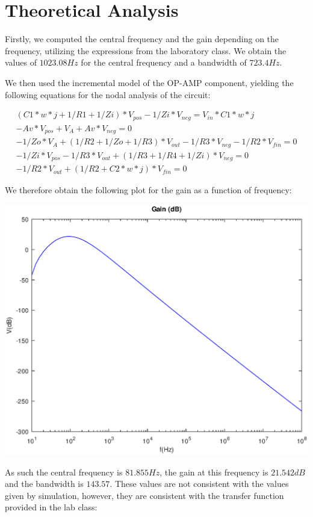 \section{Theoretical Analysis}
\label{sec:analysis}

Firstly, we computed the central frequency and the gain depending on the frequency, utilizing the expressions from  the laboratory class.
We obtain the values of $1023.08 Hz$ for the central frequency and a bandwidth of $723.4 Hz$.

We then used the incremental model of the OP-AMP component, yielding the following equations for the nodal analysis of the circuit:

\begin{equation}
    \begin{split}
        (C1*w*j+1/R1+1/Zi)*V_{pos}-1/Zi*V_{neg}=V_{in}*C1*w*j\\
        -Av*V_{pos}+V_{A}+Av*V_{neg}=0\\
        -1/Zo*V_{A}+(1/R2+1/Zo+1/R3)*V_{out}-1/R3*V_{neg}-1/R2*V_{fin}=0\\
        -1/Zi*V_{pos}-1/R3*V_{out}+(1/R3+1/R4+1/Zi)*V_{neg}=0\\
        -1/R2*V_{out}+(1/R2+C2*w*j)*V_{fin}=0
    \end{split}
\end{equation}

We therefore obtain the following plot for the gain as a function of frequency:

\includegraphics[width=0.8\linewidth]{t5dB.eps}

As such the central frequency is $81.855 Hz$, the gain at this frequency is $21.542 dB$ and the bandwidth is $143.57$.
These values are not consistent with the values given by simulation, however, they are consistent with the transfer function provided in the lab class:

